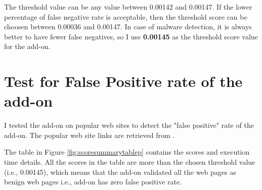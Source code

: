 The threshold value can be any value between 0.00142 and 0.00147. If the lower percentage of false negative rate is acceptable, then the threshold score can be choosen between 0.00036 and 0.00147. In case of malware detection, it is always better to have fewer false negatives, so I use \textbf{0.00145} as the threshold score value for the add-on.

\section{Test for False Positive rate of the add-on}

I tested the add-on on popular web sites to detect the "false positive" rate of the add-on. The popular web site links are retrieved from \cite{bib34}. 

The table in Figure \ref{fig:scoresummarytablep} contains the scores and execution time details. All the scores in the table are more than the chosen threshold value (i.e., 0.00145), which means that the add-on validated all the web pages as benign web pages i.e., add-on has zero false positive rate.

